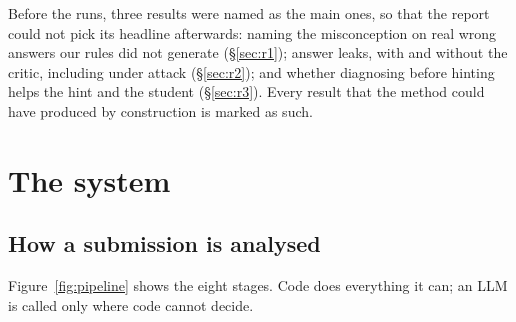 \documentclass[11pt,a4paper]{article}
\begin{document}
Before the runs, three results were named as the main ones, so that the report could not pick its headline afterwards: naming the misconception on real wrong answers our rules did not generate (\S\ref{sec:r1}); answer leaks, with and without the critic, including under attack (\S\ref{sec:r2}); and whether diagnosing before hinting helps the hint and the student (\S\ref{sec:r3}). Every result that the method could have produced by construction is marked as such.


\section{The system}\label{sec:system}

\subsection{How a submission is analysed}

Figure~\ref{fig:pipeline} shows the eight stages. Code does everything it can; an LLM is called only where code cannot decide.
\end{document}
